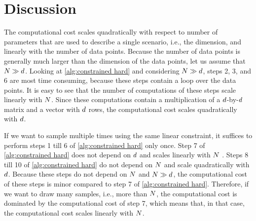 \section{Discussion}
\label{sec:discussion}

The computational cost scales quadratically with respect to number of parameters that are used to describe a single scenario, i.e., the dimension, and linearly with the number of data points.
Because the number of data points is generally much larger than the dimension of the data points, let us assume that $N \gg d$.
Looking at \cref{alg:constrained hard} and considering $N \gg d$, steps 2, 3, and 6 are most time consuming, because these steps contain a loop over the data points. 
It is easy to see that the number of computations of these steps scale linearly with $N$. 
Since these computations contain a multiplication of a $d$-by-$d$ matrix and a vector with $d$ rows, the computational cost scales quadratically with $d$. 

If we want to sample multiple times using the same linear constraint, it suffices to perform steps 1 till 6 of \cref{alg:constrained hard} only once.
Step 7 of \cref{alg:constrained hard} does not depend on $d$ and scales linearly with $N$ \autocite{vose1991linear}.
Steps 8 till 10 of \cref{alg:constrained hard} do not depend on $N$ and scale quadratically with $d$.
Because these steps do not depend on $N$ and $N \gg d$, the computational cost of these steps is minor compared to step 7 of \cref{alg:constrained hard}. 
\cstarta Therefore, if we want to draw many samples, i.e., more than $N$, the computational cost is dominated by the computational cost of step 7, which means that, in that case, the computational cost scales linearly with $N$. \cenda


